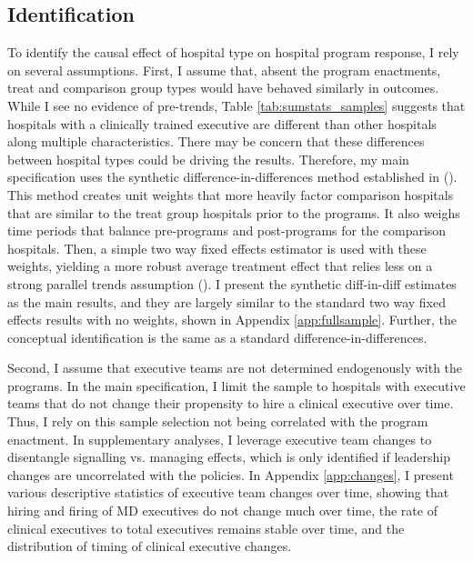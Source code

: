 \documentclass[12pt]{article}
\begin{document}
    

    \subsection{Identification}\label{sec:identification}

    To identify the causal effect of hospital type on hospital program response, I rely on several assumptions. First, I assume that, absent the program enactments, treat and comparison group types would have behaved similarly in outcomes. While I see no evidence of pre-trends, Table \ref{tab:sumstats_samples} suggests that hospitals with a clinically trained executive are different than other hospitals along multiple characteristics. There may be concern that these differences between hospital types could be driving the results. Therefore, my main specification uses the synthetic difference-in-differences method established in \citeauthor{arkhangelsky2021synthetic} (\citeyear{arkhangelsky2021synthetic}). This method creates unit weights that more heavily factor comparison hospitals that are similar to the treat group hospitals prior to the programs. It also weighs time periods that balance pre-programs and post-programs for the comparison hospitals. Then, a simple two way fixed effects estimator is used with these weights, yielding a more robust average treatment effect that relies less on a strong parallel trends assumption (\cite{arkhangelsky2021synthetic}). I present the synthetic diff-in-diff estimates as the main results, and they are largely similar to the standard two way fixed effects results with no weights, shown in Appendix \ref{app:fullsample}. Further, the conceptual identification is the same as a standard difference-in-differences.

     Second, I assume that executive teams are not determined endogenously with the programs. In the main specification, I limit the sample to hospitals with executive teams that do not change their propensity to hire a clinical executive over time. Thus, I rely on this sample selection not being correlated with the program enactment. In supplementary analyses, I leverage executive team changes to disentangle signalling vs. managing effects, which is only identified if leadership changes are uncorrelated with the policies. In Appendix \ref{app:changes}, I present various descriptive statistics of executive team changes over time, showing that hiring and firing of MD executives do not change much over time, the rate of clinical executives to total executives remains stable over time, and the distribution of timing of clinical executive changes. 
\end{document}
